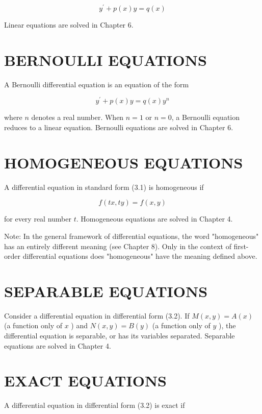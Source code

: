 \documentclass[10pt]{article}
\begin{document}
\begin{equation*}
y^{\prime}+p(x) y=q(x) \tag{3.3}
\end{equation*}


Linear equations are solved in Chapter 6.

\section*{BERNOULLI EQUATIONS}
A Bernoulli differential equation is an equation of the form


\begin{equation*}
y^{\prime}+p(x) y=q(x) y^{n} \tag{3.4}
\end{equation*}


where $n$ denotes a real number. When $n=1$ or $n=0$, a Bernoulli equation reduces to a linear equation. Bernoulli equations are solved in Chapter 6.

\section*{HOMOGENEOUS EQUATIONS}
A differential equation in standard form (3.1) is homogeneous if


\begin{equation*}
f(t x, t y)=f(x, y) \tag{3.5}
\end{equation*}


for every real number $t$. Homogeneous equations are solved in Chapter 4.

Note: In the general framework of differential equations, the word "homogeneous" has an entirely different meaning (see Chapter 8). Only in the context of first-order differential equations does "homogeneous" have the meaning defined above.

\section*{SEPARABLE EQUATIONS}
Consider a differential equation in differential form (3.2). If $M(x, y)=A(x)$ (a function only of $x$ ) and $N(x, y)=B(y)$ (a function only of $y$ ), the differential equation is separable, or has its variables separated. Separable equations are solved in Chapter 4.

\section*{EXACT EQUATIONS}
A differential equation in differential form (3.2) is exact if
\end{document}
